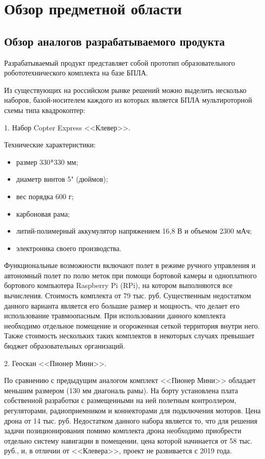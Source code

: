 
\section{Обзор предметной области}

\subsection{Обзор аналогов разрабатываемого продукта}
Разрабатываемый продукт представляет собой прототип образовательного робототехнического комплекта на базе БПЛА.

Из существующих на российском рынке решений можно выделить нес\-колько наборов, базой-носителем каждого из которых является БПЛА мультироторной схемы типа квадрокоптер:

1. Набор Copter Express <<Клевер>>.

Технические характеристики:
\begin{itemize}
	\item размер 330*330 мм;
	\item диаметр винтов 5" (дюймов);
	\item вес порядка 600 г;
	\item карбоновая рама;
	\item литий-полимерный аккумулятор напряжением 16,8 В и объемом 2300 мАч;
	\item электроника своего производства.
\end{itemize}

Функциональные возможности включают полет в режиме ручного управления и автономный полет по полю меток при помощи бортовой камеры и одноплатного бортового компьютера Raspberry Pi (RPi), на котором выполняются все вычисления. Стоимость комплекта от 79 тыс. руб. Существенным недостатком данного варианта является его большие размер и мощность, что делает его использование травмоопасным. При использовании данного комплекта необходимо отдельное помещение и огороженная сеткой территория внутри него. Также стоимость нескольких таких комплектов в некоторых случаях превышает бюджет образовательных организаций.

2. Геоскан <<Пионер Мини>>.

По сравнению с предыдущим аналогом комплект <<Пионер Мини>> обладает меньшим размером (130 мм диагональ рамы). На борту установлена плата собственной разработки с размещенными на ней полетным контроллером, регуляторами, радиоприемником и коннекторами для подключения моторов. Цена дрона от 14 тыс. руб. Недостатком данного набора является то, что для решения задачи позиционирования помимо комплекта дрона необходимо приобрести отдельно систему навигации в помещении, цена которой начинается от 58 тыс. руб., и, в отличии от <<Клевера>>, проект не развивается с 2019 года.


